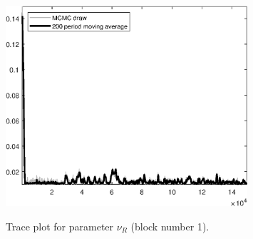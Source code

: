 \begin{figure}[H]
\centering
  \includegraphics[width=0.8\textwidth]{BRS_sectoral_wo_gmf/graphs/TracePlot_nu_R_blck_1}\\
    \caption{Trace plot for parameter ${\nu_R}$ (block number 1).}
\end{figure}
